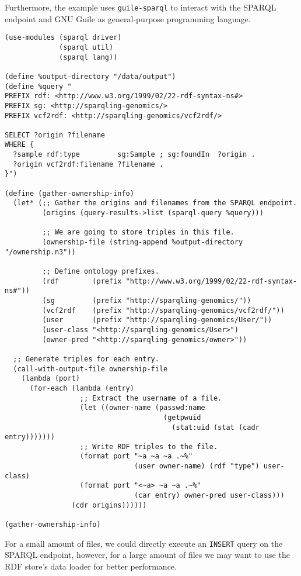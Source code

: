   Furthermore, the example uses \texttt{guile-sparql} to interact with the
  SPARQL endpoint and GNU Guile as general-purpose programming language.

\begin{siderules}
\begin{verbatim}
(use-modules (sparql driver)
             (sparql util)
             (sparql lang))

(define %output-directory "/data/output")
(define %query "
PREFIX rdf: <http://www.w3.org/1999/02/22-rdf-syntax-ns#>
PREFIX sg: <http://sparqling-genomics/>
PREFIX vcf2rdf: <http://sparqling-genomics/vcf2rdf/>

SELECT ?origin ?filename
WHERE {
  ?sample rdf:type         sg:Sample ; sg:foundIn  ?origin .
  ?origin vcf2rdf:filename ?filename .
}")

(define (gather-ownership-info)
  (let* (;; Gather the origins and filenames from the SPARQL endpoint.
         (origins (query-results->list (sparql-query %query)))

         ;; We are going to store triples in this file.
         (ownership-file (string-append %output-directory "/ownership.n3"))

         ;; Define ontology prefixes.
         (rdf        (prefix "http://www.w3.org/1999/02/22-rdf-syntax-ns#"))
         (sg         (prefix "http://sparqling-genomics/"))
         (vcf2rdf    (prefix "http://sparqling-genomics/vcf2rdf/"))
         (user       (prefix "http://sparqling-genomics/User/"))
         (user-class "<http://sparqling-genomics/User>")
         (owner-pred "<http://sparqling-genomics/owner>"))

  ;; Generate triples for each entry.
  (call-with-output-file ownership-file
    (lambda (port)
      (for-each (lambda (entry)
                  ;; Extract the username of a file.
                  (let ((owner-name (passwd:name
                                      (getpwuid
                                        (stat:uid (stat (cadr entry)))))))
                  ;; Write RDF triples to the file.
                  (format port "~a ~a ~a .~%"
                               (user owner-name) (rdf "type") user-class)
                  (format port "<~a> ~a ~a .~%"
                               (car entry) owner-pred user-class)))
                (cdr origins))))))

(gather-ownership-info)
\end{verbatim}
\end{siderules}

  For a small amount of files, we could directly execute an \texttt{INSERT}
  query on the SPARQL endpoint, however, for a large amount of files we may
  want to use the RDF store's data loader for better performance.

